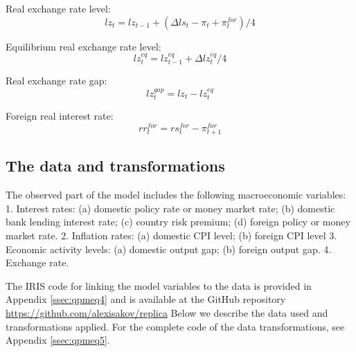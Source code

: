 \documentclass[12pt]{article}
\begin{document}
Real exchange rate level:
\begin{equation}
	lz_t = lz_{t-1} + (\Delta ls_t -\pi_t + \pi_t^{for})/4
\end{equation}

Equilibrium real exchange rate level:
\begin{equation}
	lz_t^{eq} = lz_{t-1}^{eq} + \Delta lz_{t}^{eq}/4
\end{equation}

Real exchange rate gap: 
\begin{equation}
	lz_t^{gap} = lz_t - lz_t^{eq}
\end{equation}

Foreign real interest rate:
\begin{equation}
	rr_t^{for} = rs_t^{for} - \pi_{t+1}^{for}
\end{equation}

\subsection{The data and transformations \label{ssec:dataqpm}}


The observed part of the model includes the following macroeconomic variables: 1. Interest rates:  (a) domestic policy rate or money market rate; (b) domestic bank lending interest rate; (c) country risk premium; (d) foreign policy or money market rate. 2. Inflation rates: (a) domestic CPI level; (b) foreign CPI level 3. Economic activity levels: (a) domestic output gap; (b) foreign output gap.  4. Exchange rate. 

The IRIS code for linking the model variables to the data is provided in Appendix \ref{ssec:qpmeq4} {\color{blue} and is available at the GitHub repository \href{https://github.com/alexisakov/replica}{https://github.com/alexisakov/replica}}  Below we describe the data used and transformations applied. For the complete code of the data transformations, see Appendix \ref{ssec:qpmeq5}. 
\end{document}
